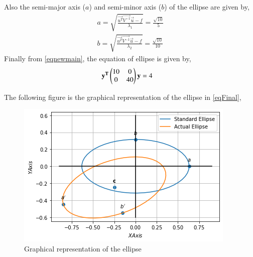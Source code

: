 \documentclass[journal,12pt,twocolumn]{IEEEtran}
\begin{document}
Also the semi-major axis ($a$) and semi-minor axis ($b$) of the ellipse are given by,
\begin{align}
a = \sqrt{\frac{\vec{u^T}\vec{V^{-1}}\vec{u}-f}{\lambda_1}}=\frac{\sqrt{10}}{5}\\
b = \sqrt{\frac{\vec{u^T}\vec{V^{-1}}\vec{u}-f}{\lambda_2}}=\frac{\sqrt{10}}{10}
\end{align}
Finally from \eqref{eqnewmain}, the equation of ellipse is given by,
\begin{align}
&\mathbf{y^T}\begin{pmatrix}10&0\\0&40\end{pmatrix}\mathbf{y}=4\label{eqFinal}
\end{align}

The following figure is the graphical representation of the ellipse in \eqref{eqFinal},
\renewcommand{\thefigure}{1}
\begin{figure}[t]
\centering
\includegraphics[width = \columnwidth]{Ellipse.png}
\caption{Graphical representation of the ellipse}
\label{fig:my_label}
\end{figure}
\end{document}
